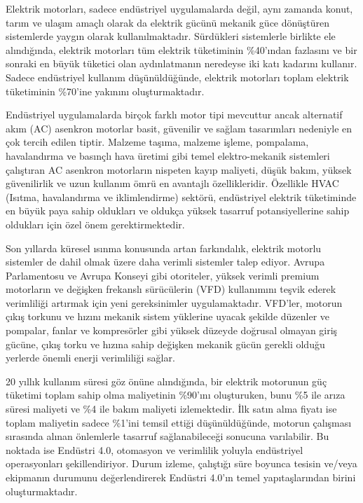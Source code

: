 Elektrik motorları, sadece endüstriyel uygulamalarda değil, aynı zamanda konut, tarım ve ulaşım amaçlı olarak da elektrik gücünü mekanik güce dönüştüren sistemlerde yaygın olarak kullanılmaktadır. Sürdükleri sistemlerle birlikte ele alındığında, elektrik motorları tüm elektrik tüketiminin \%40'ından fazlasını ve bir sonraki en büyük tüketici olan aydınlatmanın neredeyse iki katı kadarını kullanır. Sadece endüstriyel kullanım düşünüldüğünde, elektrik motorları toplam elektrik tüketiminin \%70'ine yakınını oluşturmaktadır.

Endüstriyel uygulamalarda birçok farklı motor tipi mevcuttur ancak alternatif akım (AC) asenkron motorlar basit, güvenilir ve sağlam tasarımları nedeniyle en çok tercih edilen tiptir. Malzeme taşıma, malzeme işleme, pompalama, havalandırma ve basınçlı hava üretimi gibi temel elektro-mekanik sistemleri çalıştıran AC asenkron motorların nispeten kayıp maliyeti, düşük bakım, yüksek güvenilirlik ve uzun kullanım ömrü en avantajlı özellikleridir. Özellikle HVAC (Isıtma, havalandırma ve iklimlendirme) sektörü, endüstriyel elektrik tüketiminde en büyük paya sahip oldukları ve oldukça yüksek tasarruf potansiyellerine sahip oldukları için özel önem gerektirmektedir.

Son yıllarda küresel ısınma konusunda artan farkındalık, elektrik motorlu sistemler de dahil olmak üzere daha verimli sistemler talep ediyor. Avrupa Parlamentosu ve Avrupa Konseyi gibi otoriteler, yüksek verimli premium motorların ve değişken frekanslı sürücülerin (VFD) kullanımını teşvik ederek verimliliği artırmak için yeni gereksinimler uygulamaktadır. VFD'ler, motorun çıkış torkunu ve hızını mekanik sistem yüklerine uyacak şekilde düzenler ve pompalar, fanlar ve kompresörler gibi yüksek düzeyde doğrusal olmayan giriş gücüne, çıkış torku ve hızına sahip değişken mekanik gücün gerekli olduğu yerlerde önemli enerji verimliliği sağlar. 

20 yıllık kullanım süresi göz önüne alındığında, bir elektrik motorunun güç tüketimi toplam sahip olma maliyetinin \%90'ını oluşturuken, bunu \%5 ile arıza süresi maliyeti ve \%4 ile bakım maliyeti izlemektedir. İlk satın alma fiyatı ise toplam maliyetin sadece \%1'ini temsil ettiği düşünüldüğünde, motorun çalışması sırasında alınan önlemlerle tasarruf sağlanabileceği sonucuna varılabilir. Bu noktada ise Endüstri 4.0, otomasyon ve verimlilik yoluyla endüstriyel operasyonları şekillendiriyor. Durum izleme, çalıştığı süre boyunca tesisin ve/veya ekipmanın durumunu değerlendirerek Endüstri 4.0'ın temel yapıtaşlarından birini oluşturmaktadır. 

